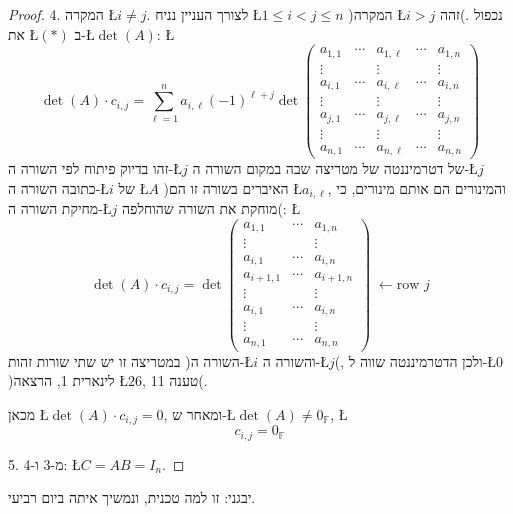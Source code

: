 \documentclass[english,hebrew]{article}
\begin{document}
\begin{proof}
4. המקרה \L{$i\neq j$}. לצורך העניין נניח \L{$1\leq i<j\leq n$}
)המקרה \L{$i>j$} זהה(. נכפול את \L{$(*)$} ב-\L{$\det(A)$}: \L{%
\[
\det(A)\cdot c_{i,j}=\sum_{\ell=1}^{n}a_{i,\ell}(-1)^{\ell+j}\det\left(\begin{array}{cc|c|cc}
a_{1,1} & \cdots & a_{1,\ell} & \cdots & a_{1,n}\\
\vdots &  & \vdots &  & \vdots\\
a_{i,1} & \cdots & a_{i,\ell} & \cdots & a_{i,n}\\
\vdots &  & \vdots &  & \vdots\\
\hline a_{j,1} & \cdots & a_{j,\ell} & \cdots & a_{j,n}\\
\hline \vdots &  & \vdots &  & \vdots\\
a_{n,1} & \cdots & a_{n,\ell} & \cdots & a_{n,n}
\end{array}\right)
\]
}%
זהו בדיוק פיתוח לפי השורה ה-\L{$j$} של דטרמיננטה של מטריצה שבה במקום
השורה ה-\L{$j$} כתובה השורה ה-\L{$i$} של \L{$A$} )האיברים בשורה
זו הם \L{$a_{i,\ell}$}, והמינורים הם אותם מינורים, כי מחיקת השורה
ה-\L{$j$} מוחקת את השורה שהוחלפה(: \L{%
\[
\det(A)\cdot c_{i,j}=\det\begin{pmatrix}a_{1,1} & \cdots & a_{1,n}\\
\vdots &  & \vdots\\
a_{i,1} & \cdots & a_{i,n}\\
a_{i+1,1} & \cdots & a_{i+1,n}\\
\vdots &  & \vdots\\
a_{i,1} & \cdots & a_{i,n}\\
\vdots &  & \vdots\\
a_{n,1} & \cdots & a_{n,n}
\end{pmatrix}\;\leftarrow\text{row }j
\]
}%
במטריצה זו יש שתי שורות זהות )השורה ה-\L{$i$} והשורה ה-\L{$j$}(,
ולכן הדטרמיננטה שווה ל-\L{$0$} )לינארית 1, הרצאה \L{$26$}, טענה
11(.

מכאן \L{$\det(A)\cdot c_{i,j}=0$}, ומאחר ש-\L{$\det(A)\neq0_{\mathbb{F}}$},
\L{%
\[
c_{i,j}=0_{\mathbb{F}}
\]
}%

5. מ-3 ו-4: \L{$C=AB=I_{n}$}. 
\end{proof}
יבגני: זו למה טכנית, ונמשיך איתה ביום רביעי.
\end{document}
